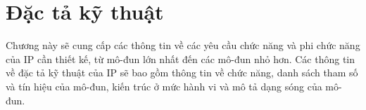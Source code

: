 \clearpage
{}

\setcounter{chapter}{1}
\chapter[{ĐẶC TẢ KỸ THUẬT}]{Đặc tả kỹ thuật}

Chương này sẽ cung cấp các thông tin về các yêu cầu chức năng và phi chức năng của IP cần thiết kế, từ mô-đun lớn nhất đến các mô-đun nhỏ hơn. Các thông tin về đặc tả kỹ thuật của IP sẽ bao gồm thông tin về chức năng, danh sách tham số và tín hiệu của mô-đun, kiến trúc ở mức hành vi và mô tả dạng sóng của mô-đun.

